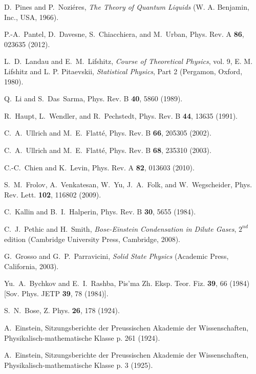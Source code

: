 \begin{thebibliography}{99}
 D.~Pines and P.~Nozi\'eres, \emph{The Theory of Quantum Liquids} (W. A. Benjamin, Inc., USA,  1966).

 P.-A.~Pantel, D.~Davesne, S.~Chiacchiera, and M.~Urban, Phys. Rev. A \textbf{86}, 023635 (2012).

 L.~D.~Landau and E.~M.~Lifshitz, \emph{Course of Theoretical Physics}, vol. 9, E. M. Lifshitz and L. P. Pitaevskii, \textit{Statistical Physics}, Part 2 (Pergamon, Oxford, 1980).

 Q.~Li and S.~Das~Sarma, Phys. Rev. B \textbf{40}, 5860 (1989).

 R.~Haupt, L.~Wendler, and R.~Pechstedt, Phys. Rev. B \textbf{44}, 13635 (1991).

 C.~A.~Ullrich and M.~E.~Flatt\'e, Phys. Rev. B \textbf{66}, 205305 (2002).

 C.~A.~Ullrich and M.~E.~Flatt\'e, Phys. Rev. B \textbf{68}, 235310 (2003).

 C.-C.~Chien and K.~Levin, Phys. Rev. A \textbf{82}, 013603 (2010).

 S.~M.~Frolov, A.~Venkatesan, W.~Yu, J.~A.~Folk, and W.~Wegscheider, Phys. Rev. Lett. \textbf{102}, 116802 (2009).

 C.~Kallin and B.~I.~Halperin, Phys. Rev. B \textbf{30}, 5655 (1984).

C.~J.~Pethic and H.~Smith, \textit{Bose-Einstein Condensation in Dilute Gases}, $2^{nd}$ edition (Cambridge University Press, Cambridge, 2008).

G.~Grosso and G.~P.~Parravicini, \textit{Solid State Physics} (Academic Press, California, 2003).

Yu.~A.~Bychkov and E.~I.~Rashba, Pis'ma Zh. Eksp. Teor. Fiz. \textbf{39}, 66 (1984) [Sov. Phys. JETP \textbf{39}, 78 (1984)].

S.~N.~Bose, Z. Phys. \textbf{26}, 178 (1924).

A.~Einstein, Sitzungsberichte der Preussischen Akademie der Wissenschaften, Physikalisch-mathematische Klasse p. 261 (1924).

A.~Einstein, Sitzungsberichte der Preussischen Akademie der Wissenschaften, Physikalisch-mathematische Klasse p. 3 (1925).

\end{thebibliography}
